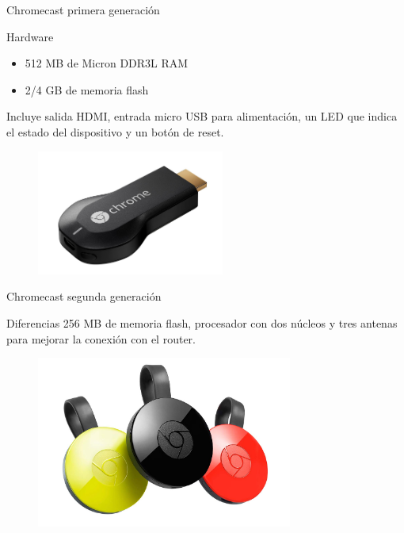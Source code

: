 \begin{frame}{Chromecast primera generación}
	\begin{block}{Hardware}
		\begin{itemize}
			\item 512 MB de Micron DDR3L RAM
			\item 2/4 GB de memoria flash
		\end{itemize}
		Incluye salida HDMI, entrada micro USB para alimentación, un LED que indica el estado del dispositivo y un botón de reset.
	\end{block}
	\begin{figure}[h]
		\centering
		\includegraphics[width=0.55\textwidth]{./Imagenes/chromecast1gen.jpg}
	\end{figure}
\end{frame}


\begin{frame}{Chromecast segunda generación}
	\begin{block}{Diferencias}
		256 MB de memoria flash, procesador con dos núcleos y tres antenas para mejorar la conexión con el router.
	\end{block}
	\begin{figure}[h]
		\centering
		\includegraphics[width=0.75\textwidth]{./Imagenes/chromecast2gen.jpg}
	\end{figure}
\end{frame}


